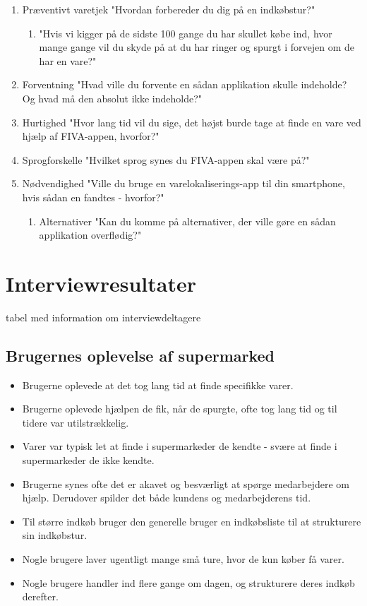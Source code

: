 \documentclass[12pt]{article}
\begin{document}
\begin{enumerate}
\item Præventivt varetjek "Hvordan forbereder du dig på en indkøbstur?"

\begin{enumerate}
\item "Hvis vi kigger på de sidste 100 gange du har skullet købe ind, hvor mange gange vil du skyde på at du har ringer og spurgt i forvejen om de har en vare?"
\end{enumerate}

\item Forventning "Hvad ville du forvente en sådan applikation skulle indeholde? Og hvad må den absolut ikke indeholde?"
\item Hurtighed	"Hvor lang tid vil du sige, det højst burde tage at finde en vare ved hjælp af FIVA-appen, hvorfor?"
\item Sprogforskelle "Hvilket sprog synes du FIVA-appen skal være på?"
\item Nødvendighed "Ville du bruge en varelokaliserings-app til din smartphone, hvis sådan en fandtes - hvorfor?"

\begin{enumerate}
\item Alternativer "Kan du komme på alternativer, der ville gøre en sådan applikation overflødig?"
\end{enumerate}

\end{enumerate}

\section{Interviewresultater}
tabel med information om interviewdeltagere
\subsection{Brugernes oplevelse af supermarked}
\begin{itemize}
\item Brugerne oplevede at det tog lang tid at finde specifikke varer.
\item Brugerne oplevede hjælpen de fik, når de spurgte, ofte tog lang tid og til tidere var utilstrækkelig.
\item Varer var typisk let at finde i supermarkeder de kendte - svære at finde i supermarkeder de ikke kendte.
\item Brugerne synes ofte det er akavet og besværligt at spørge medarbejdere om hjælp. Derudover spilder det både kundens og medarbejderens tid.
\item Til større indkøb bruger den generelle bruger en indkøbsliste til at strukturere sin indkøbstur.
\item Nogle brugere laver ugentligt mange små ture, hvor de kun køber få varer.
\item Nogle brugere handler ind flere gange om dagen, og strukturere deres indkøb derefter. 
\end{itemize}
\end{document}
